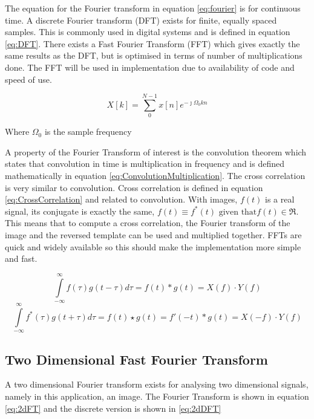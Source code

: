 The equation for the Fourier transform in equation \eqref{eq:fourier} is for continuous time. A discrete Fourier transform (DFT) exists for finite, equally spaced samples. This is commonly used in digital systems and is defined in equation \eqref{eq:DFT}. There exists a Fast Fourier Transform (FFT) which gives exactly the same results as the DFT, but is optimised in terms of number of multiplications done. The FFT will be used in implementation due to availability of code and speed of use. 

\begin{equation}\label{eq:DFT}
X[k] = \sum\limits_{0}^{N-1}x[n]e^{-\jmath \Omega_0 kn}
\end{equation}
\begin{center}
Where $\Omega_0$ is the sample frequency
\end{center}

A property of the Fourier Transform of interest is the convolution theorem which states that convolution in time is multiplication in frequency and is defined mathematically in equation \eqref{eq:ConvolutionMultiplication}. The cross correlation is very similar to convolution. Cross correlation is defined in equation \eqref{eq:CrossCorrelation} and related to convolution. With images, $f(t)$ is a real signal, its conjugate is exactly the same, $f(t) \equiv f^*(t) \text{ given that} f(t) \in \Re$. This means that to compute a cross correlation, the Fourier transform of the image and the reversed template can be used and multiplied together. FFTs are quick and widely available so this should make the implementation more simple and fast.


\begin{equation}\label{eq:ConvolutionMultiplication}
\int\limits_{-\infty}^{\infty}f(\tau)g(t-\tau)d\tau = f(t) \ast g(t) = X(f)\cdot Y(f)
\end{equation}
\begin{equation}\label{eq:CrossCorrelation}
\int\limits_{-\infty}^{\infty}f^*(\tau)g(t+\tau)d\tau = f(t) \star g(t) = f'(-t) \ast g(t) = X(-f)\cdot Y(f)
\end{equation}


\subsection{Two Dimensional Fast Fourier Transform}
A two dimensional Fourier transform exists for analysing two dimensional signals, namely in this application, an image. The Fourier Transform is shown in equation \eqref{eq:2dFT} and the discrete version is shown in \eqref{eq:2dDFT}

